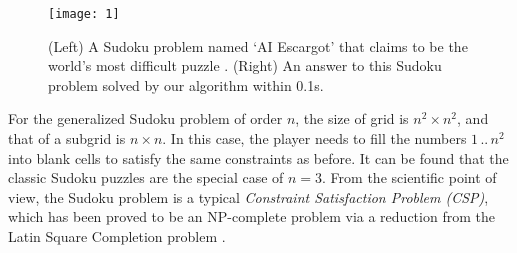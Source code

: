 \documentclass{article}
\begin{document}
\begin{figure}[t]
    \centering
    \texttt{[image: 1]}
    \caption{(Left) A Sudoku problem named `AI Escargot' that claims to be the world's most difficult puzzle \protect\cite{inkala2006aisudoku}. (Right) An answer to this Sudoku problem solved by our algorithm within 0.1s.}
    \label{fig:1}
\end{figure}

For the generalized Sudoku problem of order $n$, the size of grid is $n^2 \times n^2$, and that of a subgrid is $n \times n$. In this case, the player needs to fill the numbers $1\,..\,n^2$ into blank cells to satisfy the same constraints as before.
It can be found that the classic Sudoku puzzles are the special case of $n=3$. 
From the scientific point of view, the Sudoku problem is a typical \textit{Constraint Satisfaction Problem (CSP)}, which has been proved to be an NP-complete problem via a reduction from the Latin Square Completion problem \cite{yato2003complexity}.
\end{document}

